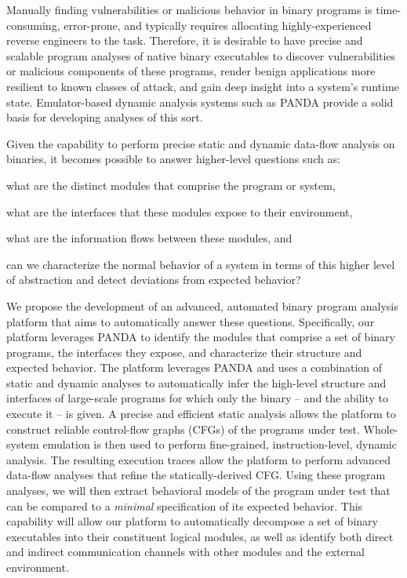 \documentclass[letterpaper,twoside,11pt,headings=small]{scrartcl}
\newcommand{\dynamicsys}{\textsc{PANDA}\xspace}
\begin{document}
Manually finding vulnerabilities or malicious behavior in binary programs is
time-consuming, error-prone, and typically requires allocating
highly-experienced reverse engineers to the task. Therefore, it is desirable
to have precise and scalable program analyses of native binary executables to
discover vulnerabilities or malicious components of these programs, render
benign applications more resilient to known classes of attack, and gain deep
insight into a system's runtime state. Emulator-based dynamic analysis systems
such as \dynamicsys provide a solid basis for developing analyses of this
sort.

Given the capability to perform precise static and dynamic data-flow analysis
on binaries, it becomes possible to answer higher-level questions such as:%
\begin{inparaenum}
    \item what are the distinct modules that comprise the program or system,
    \item what are the interfaces that these modules expose to their environment,
    \item what are the information flows between these modules, and
    \item can we characterize the normal behavior of a system in terms of this higher
        level of abstraction and detect deviations from expected behavior?
\end{inparaenum}

We propose the development of an advanced, automated binary program analysis
platform that aims to automatically answer these questions.  Specifically, our
platform leverages \dynamicsys to identify the modules that comprise a set of
binary programs, the interfaces they expose, and characterize their structure
and expected behavior.  The platform leverages \dynamicsys and uses a
combination of static and dynamic analyses to automatically infer the
high-level structure and interfaces of large-scale programs for which only the
binary -- and the ability to execute it -- is given.  A precise and efficient
static analysis allows the platform to construct reliable control-flow graphs
(CFGs) of the programs under test.  Whole-system emulation is then used to
perform fine-grained, instruction-level, dynamic analysis.  The resulting
execution traces allow the platform to perform advanced data-flow analyses
that refine the statically-derived CFG.  Using these program analyses, we will
then extract behavioral models of the program under test that can be compared
to a \emph{minimal} specification of its expected behavior.  This capability
will allow our platform to automatically decompose a set of binary executables
into their constituent logical modules, as well as identify both direct and
indirect communication channels with other modules and the external
environment.
\end{document}
